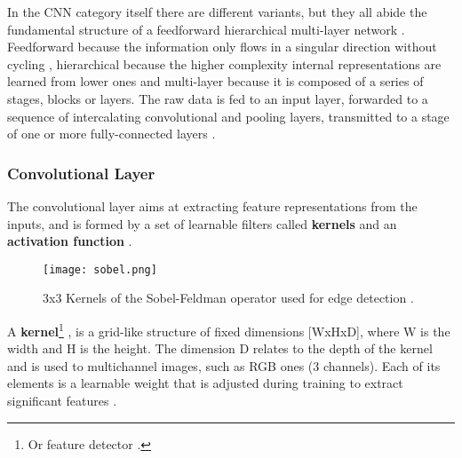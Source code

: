 \documentclass[class=report, crop=false, a4paper, 12pt]{standalone}
\begin{document}

\par In the CNN category itself there are different variants, but they all abide the fundamental structure of a feedforward hierarchical multi-layer network . Feedforward because the information only flows in a singular direction without cycling \autocite{zellSimulationNeuronalerNetze1994}, hierarchical because the higher complexity internal representations are learned from lower ones \autocite{lecunDeepLearning2015, zhuBCNNBranchConvolutional2017} and multi-layer because it is composed of a series of stages, blocks or layers. The raw data is fed to an input layer, forwarded to a sequence of intercalating convolutional and pooling layers, transmitted to a stage of one or more fully-connected layers \autocite{lecunDeepLearning2015, guRecentAdvancesConvolutional2018, alzubaidiReviewDeepLearning2021}.   

\subsubsection{Convolutional Layer}
\par The convolutional layer aims at extracting feature representations from the inputs, and is formed by a set of learnable filters called \textbf{kernels} and an \textbf{activation function} \autocite{guRecentAdvancesConvolutional2018,yamashitaConvolutionalNeuralNetworks2018}. 

\begin{figure}[!h]
    \centering
    \texttt{[image: sobel.png]}
    \caption{3x3 Kernels of the Sobel-Feldman operator used for edge detection \autocite{sobelIsotropicGradientOperator1973}.}
    \label{fig:sobel}
\end{figure}

A \textbf{kernel}\footnote{Or feature detector \autocite{ajitReviewConvolutionalNeural2020}.} , is a grid-like structure of fixed dimensions [WxHxD], where W is the width and H is the height. The dimension D relates to the depth of the kernel and is used to multichannel images, such as RGB ones (3 channels). Each of its elements is a learnable weight that is adjusted during training to extract significant features \autocite{alzubaidiReviewDeepLearning2021}. 
\end{document}

